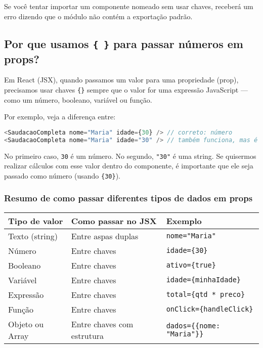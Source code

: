 Se você tentar importar um componente nomeado sem usar chaves, receberá um erro dizendo que o módulo não contém a exportação padrão.

\subsection*{Por que usamos \texttt{\{ \}} para passar números em props?}

Em React (JSX), quando passamos um valor para uma propriedade (prop), precisamos usar chaves \texttt{\{\}} sempre que o valor for uma expressão JavaScript — como um número, booleano, variável ou função.

Por exemplo, veja a diferença entre:

\begin{lstlisting}[language=JavaScript]
<SaudacaoCompleta nome="Maria" idade={30} /> // correto: número
<SaudacaoCompleta nome="Maria" idade="30" /> // também funciona, mas é string
\end{lstlisting}

No primeiro caso, \texttt{30} é um número. No segundo, \texttt{"30"} é uma string. Se quisermos realizar cálculos com esse valor dentro do componente, é importante que ele seja passado como número (usando \texttt{\{30\}}).

\subsubsection*{Resumo de como passar diferentes tipos de dados em props}

\begin{center}
\begin{tabular}{|l|l|l|}
\hline
\textbf{Tipo de valor} & \textbf{Como passar no JSX} & \textbf{Exemplo} \\
\hline
Texto (string)   & Entre aspas duplas              & \texttt{nome="Maria"} \\
Número           & Entre chaves                    & \texttt{idade=\{30\}} \\
Booleano         & Entre chaves                    & \texttt{ativo=\{true\}} \\
Variável         & Entre chaves                    & \texttt{idade=\{minhaIdade\}} \\
Expressão        & Entre chaves                    & \texttt{total=\{qtd * preco\}} \\
Função           & Entre chaves                    & \texttt{onClick=\{handleClick\}} \\
Objeto ou Array  & Entre chaves com estrutura      & \texttt{dados=\{\{nome: "Maria"\}\}} \\
\hline
\end{tabular}
\end{center}

